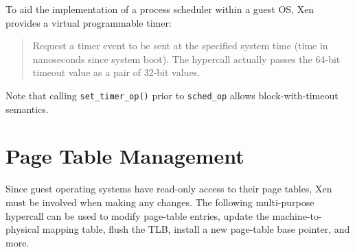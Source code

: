 To aid the implementation of a process scheduler within a guest OS,
Xen provides a virtual programmable timer:

\begin{quote}

Request a timer event to be sent at the specified system time (time 
in nanoseconds since system boot). The hypercall actually passes the 
64-bit timeout value as a pair of 32-bit values. 

\end{quote} 

Note that calling {\tt set\_timer\_op()} prior to {\tt sched\_op} 
allows block-with-timeout semantics. 


\section{Page Table Management} 

Since guest operating systems have read-only access to their page 
tables, Xen must be involved when making any changes. The following
multi-purpose hypercall can be used to modify page-table entries, 
update the machine-to-physical mapping table, flush the TLB, install 
a new page-table base pointer, and more.


